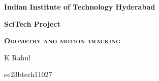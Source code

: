 \begin{titlepage}
\centering
{\bfseries\Huge Indian Institute of Technology Hyderabad\par}


\vfill
\noindent
{\bfseries\Huge SciTech Project  \par}
\bigskip%
\vspace{0.5cm}

{\bfseries\scshape Odometry and motion tracking \par}
\vspace{0.5cm}
\noindent
\vfill
{\Large K Rahul\par}
{\Large ee23btech11027 \par}
\vfill
\end{titlepage}
\setcounter{page}{0}

